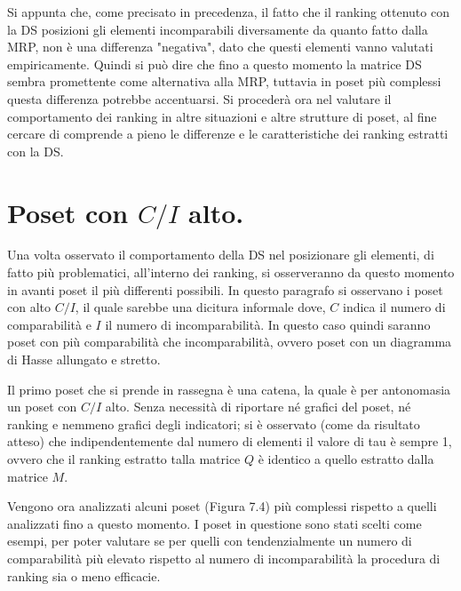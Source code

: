 \documentclass{report}
\begin{document}
Si appunta che, come precisato in precedenza, il fatto che il ranking ottenuto con la DS posizioni gli elementi incomparabili diversamente da quanto fatto dalla MRP, non è una differenza "negativa", dato che questi elementi vanno valutati empiricamente. Quindi si può dire che fino a questo momento la matrice DS sembra promettente come alternativa alla MRP, tuttavia in poset più complessi questa differenza potrebbe accentuarsi. Si procederà ora nel valutare il comportamento dei ranking in altre situazioni e altre strutture di poset, al fine cercare di comprende a pieno le differenze e le caratteristiche dei ranking estratti con la DS.


\section{Poset con $C/I$ alto.}
Una volta osservato il comportamento della DS nel posizionare gli elementi, di fatto più problematici, all'interno dei ranking, si osserveranno da questo momento in avanti poset il più differenti possibili. In questo paragrafo si osservano i poset con alto $C/I$, il quale sarebbe una dicitura informale dove, $C$ indica il numero di comparabilità e $I$ il numero di incomparabilità. In questo caso quindi saranno poset con più comparabilità che incomparabilità, ovvero poset con un diagramma di Hasse allungato e stretto.


Il primo poset che si prende in rassegna è una catena, la quale è per antonomasia un poset con $C/I$ alto. Senza necessità di riportare né grafici del poset, né ranking e nemmeno grafici degli indicatori; si è osservato (come da risultato atteso) che indipendentemente dal numero di elementi il valore di tau è sempre 1, ovvero che il ranking estratto talla matrice $Q$ è identico a quello estratto dalla matrice $M$.


Vengono ora analizzati alcuni poset (Figura 7.4) più complessi rispetto a quelli analizzati fino a questo momento. I poset in questione sono stati scelti come esempi, per poter valutare se per quelli con tendenzialmente un numero di comparabilità più elevato rispetto al numero di incomparabilità la procedura di ranking sia o meno efficacie.
\end{document}
